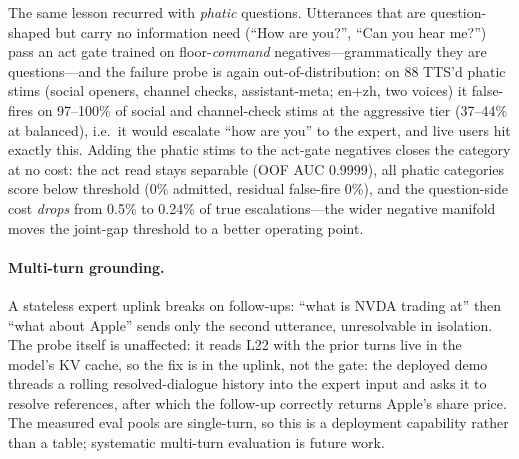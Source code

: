 The same lesson recurred with \emph{phatic} questions. Utterances
that are question-shaped but carry no information need (``How are
you?'', ``Can you hear me?'') pass an act gate trained on
floor-\emph{command} negatives---grammatically they are
questions---and the failure probe is again out-of-distribution: on
88 TTS'd phatic stims (social openers, channel checks,
assistant-meta; en+zh, two voices) it false-fires on 97--100\% of
social and channel-check stims at the aggressive tier (37--44\% at
balanced), i.e.\ it would escalate ``how are you'' to the expert,
and live users hit exactly this. Adding the phatic stims to the
act-gate negatives closes the category at no cost: the act read
stays separable (OOF AUC 0.9999), all phatic categories score below
threshold (0\% admitted, residual false-fire 0\%), and the
question-side cost \emph{drops} from 0.5\% to 0.24\% of true
escalations---the wider negative manifold moves the joint-gap
threshold to a better operating point.

\paragraph{Multi-turn grounding.} A stateless expert uplink breaks on
follow-ups: ``what is NVDA trading at'' then ``what about Apple'' sends
only the second utterance, unresolvable in isolation. The probe itself
is unaffected: it reads L22 with the prior turns live in the
model's KV cache, so the fix is in the uplink, not the gate: the
deployed demo threads a rolling resolved-dialogue history into the
expert input and asks it to resolve references, after which the
follow-up correctly returns Apple's share price. The measured eval
pools are single-turn, so this is a deployment capability rather than
a table; systematic multi-turn evaluation is future work.

